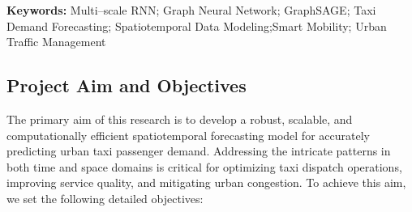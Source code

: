 \documentclass{article}
\begin{document}
\textbf{Keywords:} Multi–scale RNN; Graph Neural Network; GraphSAGE; Taxi Demand Forecasting; Spatiotemporal Data Modeling;Smart Mobility; Urban Traffic Management
\subsection{Project Aim and Objectives}

The primary aim of this research is to develop a robust, scalable, and computationally efficient spatiotemporal forecasting model for accurately predicting urban taxi passenger demand. Addressing the intricate patterns in both time and space domains is critical for optimizing taxi dispatch operations, improving service quality, and mitigating urban congestion. To achieve this aim, we set the following detailed objectives:
\end{document}

